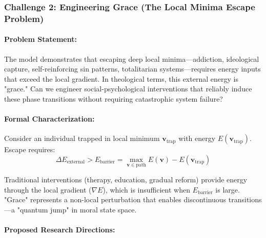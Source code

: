 \documentclass[11pt,a4paper]{article}
\theoremstyle{definition}
\theoremstyle{remark}
\begin{document}
\subsubsection{Challenge 2: Engineering Grace (The Local Minima Escape Problem)}

\paragraph{Problem Statement:} 
The model demonstrates that escaping deep local minima—addiction, ideological capture, self-reinforcing sin patterns, totalitarian systems—requires energy inputs that exceed the local gradient. In theological terms, this external energy is "grace." Can we engineer social-psychological interventions that reliably induce these phase transitions without requiring catastrophic system failure?

\paragraph{Formal Characterization:}
Consider an individual trapped in local minimum \(\mathbf{v}_{\text{trap}}\) with energy \(E(\mathbf{v}_{\text{trap}})\). Escape requires:
\begin{equation}
\Delta E_{\text{external}} > E_{\text{barrier}} = \max_{\mathbf{v} \in \text{path}} E(\mathbf{v}) - E(\mathbf{v}_{\text{trap}})
\end{equation}

Traditional interventions (therapy, education, gradual reform) provide energy through the local gradient (\(\nabla E\)), which is insufficient when \(E_{\text{barrier}}\) is large. "Grace" represents a non-local perturbation that enables discontinuous transitions—a "quantum jump" in moral state space.

\paragraph{Proposed Research Directions:}
\end{document}
